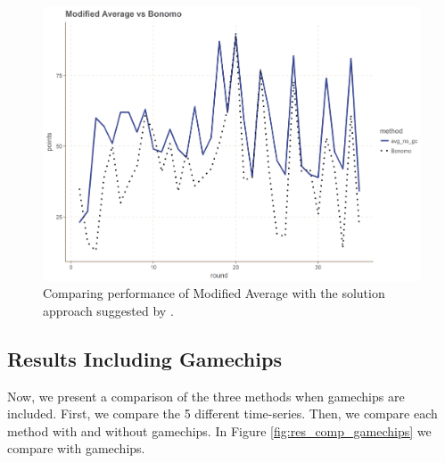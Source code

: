 \begin{figure}[H]
    \centering
    \includegraphics[scale=0.5]{fig/chapter_7/bon_gc_no_gc.png}
    \caption{Comparing performance of Modified Average with the solution approach suggested by \cite{Bonomo}.}
\label{fig:avg_vs_bon}    
\end{figure}

\begin{table}[H]
\centering
{}
\caption{Performance of Modified Average and \cite{Bonomo}}
\label{tab:bonomo_mofidified_average}
\end{table}


\subsection{Results Including Gamechips}

Now, we present a comparison of the three methods when gamechips are included. First, we compare the 5 different time-series. Then, we compare each method with and without gamechips. In Figure \ref{fig:res_comp_gamechips} we compare with gamechips.

